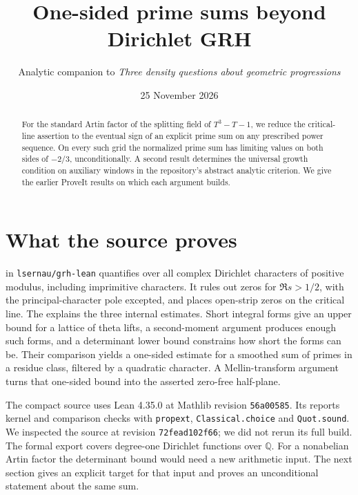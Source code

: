 \documentclass[11pt]{article}
\title{\color{ink}\textbf{One-sided prime sums beyond Dirichlet GRH}}
\author{Analytic companion to \emph{Three density questions about geometric progressions}}
\date{25 November 2026}
\begin{document}
\maketitle
\begin{abstract}
For the standard Artin factor of the splitting field of $T^3-T-1$, we reduce the critical-line assertion to the eventual sign of an explicit prime sum on any prescribed power sequence. On every such grid the normalized prime sum has limiting values on both sides of $-2/3$, unconditionally. A second result determines the universal growth condition on auxiliary windows in the repository's abstract analytic criterion. We give the earlier ProveIt results on which each argument builds.
\end{abstract}
\section{What the source proves}
 in \texttt{lsernau/grh-lean} quantifies over all complex Dirichlet characters of positive modulus, including imprimitive characters. It rules out zeros for $\Re s>1/2$, with the principal-character pole excepted, and places open-strip zeros on the critical line. The  explains the three internal estimates. Short integral forms give an upper bound for a lattice of theta lifts, a second-moment argument produces enough such forms, and a determinant lower bound constrains how short the forms can be. Their comparison yields a one-sided estimate for a smoothed sum of primes in a residue class, filtered by a quadratic character. A Mellin-transform argument turns that one-sided bound into the asserted zero-free half-plane.
 
The compact source uses Lean 4.35.0 at Mathlib revision \texttt{56a00585}. Its  reports kernel and comparison checks with \texttt{propext}, \texttt{Classical.choice} and \texttt{Quot.sound}. We inspected the source at revision \texttt{72fead102f66}; we did not rerun its full build. The formal export covers degree-one Dirichlet functions over $\mathbb Q$. For a nonabelian Artin factor the determinant bound would need a new arithmetic input. The next section gives an explicit target for that input and proves an unconditional statement about the same sum.


\end{document}
